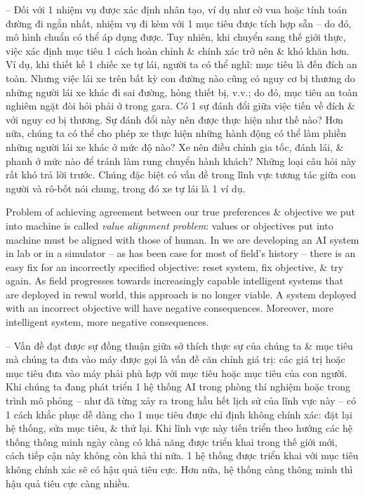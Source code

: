 \documentclass{article}
\begin{document}
\begin{itemize}
\begin{itemize}
\begin{itemize}
\begin{itemize}
				-- Đối với 1 nhiệm vụ được xác định nhân tạo, ví dụ như cờ vua hoặc tính toán đường đi ngắn nhất, nhiệm vụ đi kèm với 1 mục tiêu được tích hợp sẵn -- do đó, mô hình chuẩn có thể áp dụng được. Tuy nhiên, khi chuyển sang thế giới thực, việc xác định mục tiêu 1 cách hoàn chỉnh \& chính xác trở nên \& khó khăn hơn. Ví dụ, khi thiết kế 1 chiếc xe tự lái, người ta có thể nghĩ: mục tiêu là đến đích an toàn. Nhưng việc lái xe trên bất kỳ con đường nào cũng có nguy cơ bị thương do những người lái xe khác đi sai đường, hỏng thiết bị, v.v.; do đó, mục tiêu an toàn nghiêm ngặt đòi hỏi phải ở trong gara. Có 1 sự đánh đổi giữa việc tiến về đích \& với nguy cơ bị thương. Sự đánh đổi này nên được thực hiện như thế nào? Hơn nữa, chúng ta có thể cho phép xe thực hiện những hành động có thể làm phiền những người lái xe khác ở mức độ nào? Xe nên điều chỉnh gia tốc, đánh lái, \& phanh ở mức nào để tránh làm rung chuyển hành khách? Những loại câu hỏi này rất khó trả lời trước. Chúng đặc biệt có vấn đề trong lĩnh vực tương tác giữa con người và rô-bốt nói chung, trong đó xe tự lái là 1 ví dụ.

				Problem of achieving agreement between our true preferences \& objective we put into machine is called {\it value alignment problem}: values or objectives put into machine must be aligned with those of human. In we are developing an AI system in lab or in a simulator -- as has been case for most of field's history -- there is an easy fix for an incorrectly specified objective: reset system, fix objective, \& try again. As field progresses towards increasingly capable intelligent systems that are deployed in rewal world, this approach is no longer viable. A system deployed with an incorrect objective will have negative consequences. Moreover, more intelligent system, more negative consequences.

				-- Vấn đề đạt được sự đồng thuận giữa sở thích thực sự của chúng ta \& mục tiêu mà chúng ta đưa vào máy được gọi là vấn đề căn chỉnh giá trị: các giá trị hoặc mục tiêu đưa vào máy phải phù hợp với mục tiêu hoặc mục tiêu của con người. Khi chúng ta đang phát triển 1 hệ thống AI trong phòng thí nghiệm hoặc trong trình mô phỏng -- như đã từng xảy ra trong hầu hết lịch sử của lĩnh vực này -- có 1 cách khắc phục dễ dàng cho 1 mục tiêu được chỉ định không chính xác: đặt lại hệ thống, sửa mục tiêu, \& thử lại. Khi lĩnh vực này tiến triển theo hướng các hệ thống thông minh ngày càng có khả năng được triển khai trong thế giới mới, cách tiếp cận này không còn khả thi nữa. 1 hệ thống được triển khai với mục tiêu không chính xác sẽ có hậu quả tiêu cực. Hơn nữa, hệ thống càng thông minh thì hậu quả tiêu cực càng nhiều.


\end{itemize}
\end{itemize}
\end{itemize}
\end{itemize}
\end{document}
